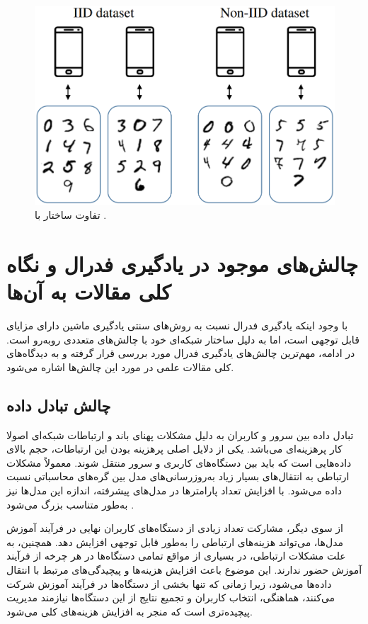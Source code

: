 \begin{figure}[b!]
	\centering
	\includegraphics[scale=0.4]{images/chap2/iid_vs_noniid.png}%
	\caption{%
		تفاوت ساختار
		با
		\cite{hellström2022wirelessmachinelearning}.
	}
	\label{iid_vs_noniid}
	\centering
\end{figure}



\section{چالش‌های موجود در یادگیری فدرال و نگاه کلی مقالات به آن‌ها}
با وجود اینکه یادگیری فدرال نسبت به روش‌های سنتی یادگیری ماشین دارای مزایای قابل توجهی است، اما به دلیل ساختار شبکه‌ای خود با چالش‌های متعددی روبه‌رو است. در ادامه، مهم‌ترین چالش‌های یادگیری فدرال مورد بررسی قرار گرفته و به دیدگاه‌های کلی مقالات علمی در مورد این چالش‌ها اشاره می‌شود.


\subsection{چالش تبادل داده}
تبادل داده بین سرور و کاربران به دلیل مشکلات پهنای باند و ارتباطات شبکه‌ای اصولا کار پرهزینه‌ای می‌باشد. یکی از دلایل اصلی پرهزینه بودن این ارتباطات، حجم بالای داده‌هایی است که باید بین دستگاه‌های کاربری و سرور منتقل شوند.
معمولاً مشکلات ارتباطی به انتقال‌های بسیار زیاد به‌روزرسانی‌های مدل بین گره‌های محاسباتی نسبت داده می‌شود. با افزایش تعداد پارامترها در مدل‌های پیشرفته، اندازه این مدل‌ها نیز به‌طور متناسب بزرگ می‌شود
\cite{wang2018atomo}.

از سوی دیگر، مشارکت تعداد زیادی از دستگاه‌های کاربران نهایی در فرآیند آموزش مدل‌ها، می‌تواند هزینه‌های ارتباطی را به‌طور قابل توجهی افزایش دهد. همچنین، به علت مشکلات ارتباطی، در بسیاری از مواقع تمامی دستگاه‌ها در هر چرخه از فرآیند آموزش حضور ندارند. این موضوع باعث افزایش هزینه‌ها و پیچیدگی‌های مرتبط با انتقال داده‌ها می‌شود، زیرا زمانی که تنها بخشی از دستگاه‌ها در فرآیند آموزش شرکت می‌کنند، هماهنگی، انتخاب کاربران و تجمیع نتایج از این دستگاه‌ها نیازمند مدیریت پیچیده‌تری است که منجر به افزایش هزینه‌های کلی می‌شود.


